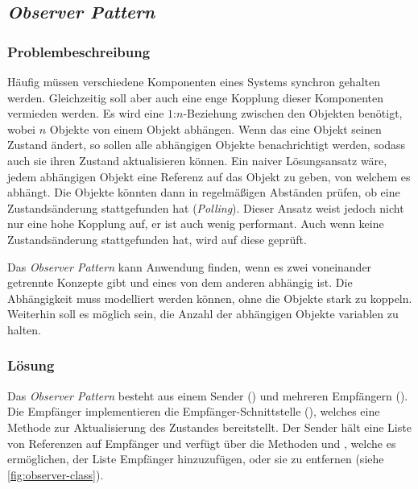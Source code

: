 \subsection{\emph{Observer Pattern}}


\subsubsection*{Problembeschreibung}

Häufig müssen verschiedene Komponenten eines Systems synchron gehalten werden. Gleichzeitig soll aber auch eine enge Kopplung dieser Komponenten vermieden werden. Es wird eine $1$:$n$-Beziehung zwischen den Objekten benötigt, wobei $n$ Objekte von einem Objekt abhängen. Wenn das eine Objekt seinen Zustand ändert, so sollen alle abhängigen Objekte benachrichtigt werden, sodass auch sie ihren Zustand aktualisieren können. Ein naiver Lösungsansatz wäre, jedem abhängigen Objekt eine Referenz auf das Objekt zu geben, von welchem es abhängt. Die Objekte könnten dann in regelmäßigen Abständen prüfen, ob eine Zustandsänderung stattgefunden hat (\emph{Polling}). Dieser Ansatz weist jedoch nicht nur eine hohe Kopplung auf, er ist auch wenig performant. Auch wenn keine Zustandsänderung stattgefunden hat, wird auf diese geprüft.

Das \emph{Observer Pattern} kann Anwendung finden, wenn es zwei voneinander getrennte Konzepte gibt und eines von dem anderen abhängig ist. Die Abhängigkeit muss modelliert werden können, ohne die Objekte stark zu koppeln. Weiterhin soll es möglich sein, die Anzahl der abhängigen Objekte variablen zu halten. \cite{gamma_design_1995}

\subsubsection*{Lösung}

Das \emph{Observer Pattern} besteht aus einem Sender () und mehreren Empfängern (). Die Empfänger implementieren die Empfänger-Schnittstelle (), welches eine Methode  zur Aktualisierung des Zustandes bereitstellt. Der Sender hält eine Liste von Referenzen auf Empfänger und verfügt über die Methoden  und , welche es ermöglichen, der Liste Empfänger hinzuzufügen, oder sie zu entfernen (siehe \autoref{fig:observer-class}).

